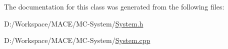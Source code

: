 The documentation for this class was generated from the following files\+:\begin{DoxyCompactItemize}
\item 
D\+:/\+Workspace/\+M\+A\+C\+E/\+M\+C-\/\+System/\hyperlink{_system_8h}{System.\+h}\item 
D\+:/\+Workspace/\+M\+A\+C\+E/\+M\+C-\/\+System/\hyperlink{_system_8cpp}{System.\+cpp}\end{DoxyCompactItemize}
